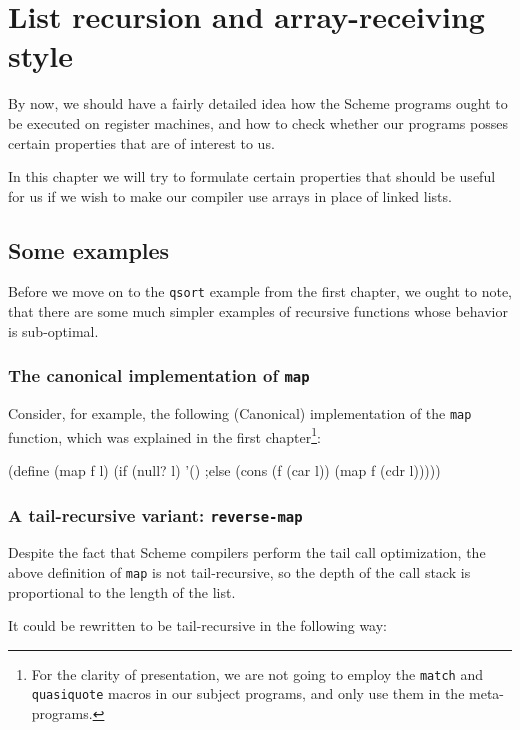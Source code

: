 \chapter{List recursion and array-receiving style}

By now, we should have a fairly detailed idea how the Scheme programs
ought to be executed on register machines, and how to check whether
our programs posses certain properties that are of interest to us.

In this chapter we will try to formulate certain properties that
should be useful for us if we wish to make our compiler use arrays
in place of linked lists.

\section{Some examples}

Before we move on to the \texttt{qsort} example from the first chapter,
we ought to note, that there are some much simpler examples of recursive
functions whose behavior is sub-optimal.

\subsection{The canonical implementation of \texttt{map}}

Consider, for example, the following (Canonical) implementation of the
\texttt{map} function, which was explained in the first chapter\footnote{
  For the clarity of presentation, we are not going to employ the
  \texttt{match} and \texttt{quasiquote} macros in our subject programs,
  and only use them in the meta-programs.
}:

\begin{Snippet}
  (define (map f l)
    (if (null? l)
      '()
    ;else
      (cons (f (car l)) (map f (cdr l)))))
\end{Snippet}

\subsection{A tail-recursive variant: \texttt{reverse-map}}

Despite the fact that Scheme compilers perform the tail call optimization,
the above definition of \texttt{map} is not tail-recursive, so the depth
of the call stack is proportional to the length of the list.

It could be rewritten to be tail-recursive in the following way:

